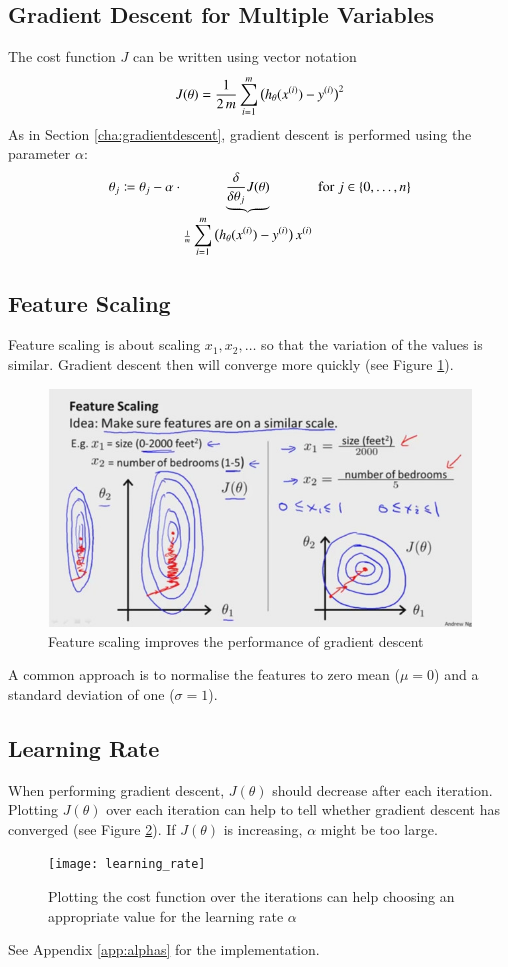 \documentclass[a4paper,twoside,10pt]{article}
\begin{document}
\subsection{Gradient Descent for Multiple Variables}\label{cha:linearregression}
The cost function $J$ can be written using vector notation
\begin{equation*}
  J(\theta)=\frac{1}{2\,m}\displaystyle\sum_{i=1}^m\big(h_\theta(x^{(i)})-y^{(i)}\big)^2
\end{equation*}
As in Section \ref{cha:gradientdescent}, gradient descent is performed using the parameter $\alpha$:
\begin{equation*}
  \theta_j\coloneqq\theta_j-\alpha\cdot\underbrace{\frac{\delta}{\delta\theta_j}J(\theta)}_
  {\frac{1}{m}\sumi\big(h_\theta(\sxi)-\syi\big)\,\sxi}\mathrm{\ for\ }j\in\{0,\ldots,n\}
\end{equation*}

\subsection{Feature Scaling}
Feature scaling is about scaling $x_1,x_2,\ldots$ so that the variation of the values is similar.
Gradient descent then will converge more quickly (see Figure \ref{fig:scaling}).
\begin{figure}[htbp]
  \begin{center}
    \includegraphics[width=.6\textwidth]{scaling}
    \caption{Feature scaling improves the performance of gradient descent\citep{andrewng}\label{fig:scaling}}
  \end{center}
\end{figure}
A common approach is to normalise the features to zero mean ($\mu=0$) and a standard deviation of one ($\sigma=1$).

\subsection{Learning Rate}
When performing gradient descent, $J(\theta)$ should decrease after each iteration.
Plotting $J(\theta)$ over each iteration can help to tell whether gradient descent has converged (see Figure \ref{fig:alphas}).
If $J(\theta)$ is increasing, $\alpha$ might be too large.
\begin{figure}[htbp]
  \begin{center}
    \texttt{[image: learning\_rate]}
  \caption{Plotting the cost function over the iterations can help choosing an appropriate value for the learning rate $\alpha$\label{fig:alphas}}
  \end{center}
\end{figure}
See Appendix \ref{app:alphas} for the implementation.
\end{document}
